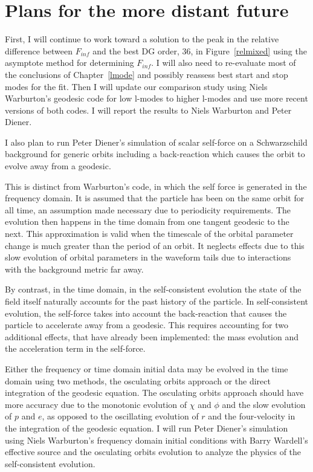\section{Plans for the more distant future}
First, I will continue to work toward a solution to the peak in the relative difference between $F_{inf}$ and the best DG order, 36, in Figure~\ref{relmixed} using the asymptote method for determining $F_{inf}$. I will also need to re-evaluate most of the conclusions of Chapter~\ref{lmode} and possibly reassess best start and stop modes for the fit. Then I will update our comparison study using Niels Warburton's geodesic code for low l-modes to higher l-modes and use more recent versions of both codes. I will report the results to Niels Warburton and Peter Diener. 

I also plan to run Peter Diener's simulation of scalar self-force on a Schwarzschild background for generic orbits including a back-reaction which causes the orbit to evolve away from a geodesic.

This is distinct from Warburton's code, in which the self force is generated in the frequency domain. It is assumed that the particle has been on the same orbit for all time, an assumption made necessary due to periodicity requirements. The evolution then happens in the time domain from one tangent geodesic to the next. This approximation is valid when the timescale of the orbital parameter change is much greater than the period of an orbit. It neglects effects due to this slow evolution of orbital parameters in the waveform tails due to interactions with the background metric far away.

By contrast, in the time domain, in the self-consistent evolution the state of the field itself naturally accounts for the past history of the particle. In self-consistent evolution, the self-force takes into account the back-reaction that causes the particle to accelerate away from a geodesic. This requires accounting for two additional effects, that have already been implemented: the mass evolution and the acceleration term in the self-force. 


Either the frequency or time domain initial data may be evolved in the time domain using two methods, the osculating orbits approach or the direct integration of the geodesic equation. The osculating orbits approach should have more accuracy due to the monotonic evolution of $\chi$ and $\phi$ and the slow evolution of $p$ and $e$, as opposed to the oscillating evolution of $r$ and the four-velocity in the integration of the geodesic equation. I will run Peter Diener's simulation using Niels Warburton's frequency domain initial conditions with Barry Wardell's effective source and the osculating orbits evolution to analyze the physics of the self-consistent evolution. 


